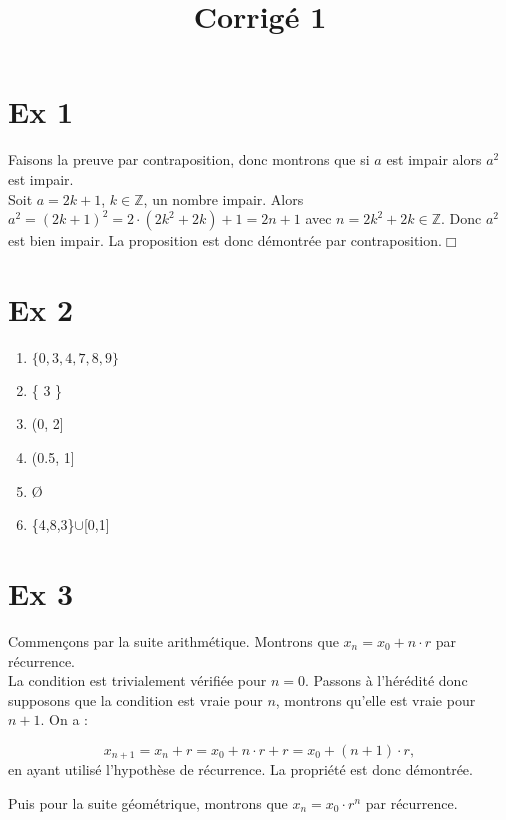 \documentclass[a4paper, 12pt, french, twoside]{article}
\title{Corrigé 1}
\newcommand{\Zz}{{\mathbb{Z}}}
\begin{document}
\maketitle

\newpage
\section{Ex 1}

Faisons la preuve par contraposition, donc montrons que si $a$ est impair alors $a^2$ est impair.\\

Soit $a=2k+1$, $k\in \Zz$, un nombre impair. Alors $a^2=(2k+1)^2=2\cdot(2k^2+2k)+1=2n+1$ avec $n=2k^2+2k\in \Zz$. Donc $a^2$ est bien impair. La proposition est donc démontrée par contraposition.$\Box$


\section{Ex 2}

\begin{enumerate}
    \item $\{0,3,4,7,8,9\}$
    \item \{ 3 \}
    \item   (0, 2]
    \item (0.5, 1]
    \item  \O
    \item \{4,8,3\}$\cup$[0,1]
\end{enumerate}


\section{Ex 3}
Commençons par la suite arithmétique. Montrons que $x_n=x_0+n\cdot r$ par récurrence.\\

La condition est trivialement vérifiée pour $n=0$. Passons à l'hérédité donc supposons que la condition est vraie pour $n$, montrons qu'elle est vraie pour $n+1$. On a :

\begin{equation}
    x_{n+1}=x_n+r=x_0+n\cdot r+r=x_0+(n+1)\cdot r,
\end{equation}
en ayant utilisé l'hypothèse de récurrence. La propriété est donc démontrée.

Puis pour la suite géométrique, montrons que $x_n=x_0\cdot r^n$ par récurrence.\\
\end{document}
